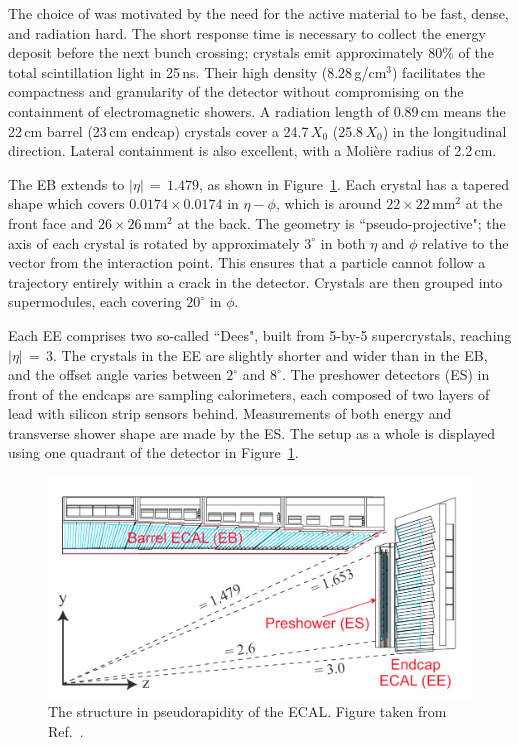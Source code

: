 The choice of \pbw was motivated by the need for the active material to be fast, dense, and radiation hard.
The short response time is necessary to collect the energy deposit before the next bunch crossing; 
\pbw crystals emit approximately 80\% of the total scintillation light in 25\,ns.
Their high density (8.28\,g/$\textrm{cm}^3$) facilitates the compactness and granularity of the detector without compromising on the containment of electromagnetic showers.
A radiation length of 0.89\,cm means the 22\,cm barrel (23\,cm endcap) crystals cover a 24.7\,$X_0$ (25.8\,$X_0$) in the longitudinal direction. %
Lateral containment is also excellent, with a Moli\`ere radius of 2.2\,cm. %

The EB extends to $|\eta|\,=\,1.479$, as shown in Figure~\ref{fig:detector_ECALquadrant}.
Each crystal has a tapered shape which covers $0.0174\times0.0174$ in $\eta-\phi$, 
which is around $22\times22\,\textrm{mm}^2$ at the front face and $26\times26\,\textrm{mm}^2$ at the back.
The geometry is ``pseudo-projective"; the axis of each crystal is rotated by approximately $3^{\circ}$ in both $\eta$ and $\phi$ relative to the vector from the interaction point.
This ensures that a particle cannot follow a trajectory entirely within a crack in the detector.
Crystals are then grouped into supermodules, each covering $20^{\circ}$ in $\phi$.

Each EE comprises two so-called ``Dees", built from 5-by-5 supercrystals, reaching $|\eta|\,=\,3$.
The crystals in the EE are slightly shorter and wider than in the EB, 
and the offset angle varies between $2^{\circ}$ and $8^{\circ}$.
The preshower detectors (ES) in front of the endcaps are sampling calorimeters, 
each composed of two layers of lead with silicon strip sensors behind. %
Measurements of both energy and transverse shower shape are made by the ES.
The setup as a whole is displayed using one quadrant of the detector in Figure~\ref{fig:detector_ECALquadrant}.

\begin{figure}[h!]
  \centering
  \includegraphics[width=\textwidth]{Figures/Detector/ECALquadrant.png}
  \caption[The structure in pseudorapidity of the CMS ECAL.]
  {The structure in pseudorapidity of the ECAL.
  Figure taken from Ref.~\cite{ECALperformance}.}
  \label{fig:detector_ECALquadrant}
\end{figure}

